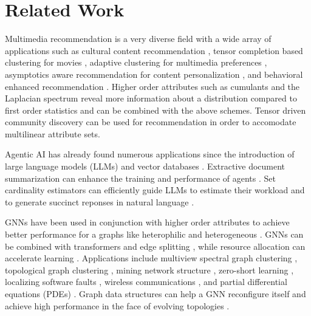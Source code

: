 \documentclass[conference, compsoc, final]{IEEEtran}
\begin{document}
\section{Related Work}\label{sec:work}


Multimedia recommendation \cite{wu:2020} is a very diverse field \cite{sattari:2025}\cite{gan:2025} with a wide array of applications such as cultural content recommendation \cite{drakop:2022:ncaa:som}, tensor completion based clustering for movies \cite{wang:2025}, adaptive clustering for multimedia preferences \cite{xiong:2025}, asymptotics aware recommendation for content personalization \cite{xu:2025}, and behavioral enhanced recommendation \cite{drakop:2021:iisa:beh}. Higher order attributes such as cumulants \cite{pakravan:2018}\cite{bonnier:2024} and the Laplacian spectrum \cite{zhuo:2024} reveal more information about a distribution compared to first order statistics \cite{cho:2024}\cite{li:2024} and can be combined with the above schemes. Tensor driven community discovery can be used for recommendation \cite{drakop:2020:smap:kruskal} in order to accomodate multilinear attribute sets.  

Agentic AI \cite{abou:2025}\cite{pati:2025} has already found numerous applications since the introduction of large language models (LLMs) \cite{acharya:2025} and vector databases \cite{drakop:2025:adhd:func}. Extractive document summarization \cite{drakop:2025:adhd:gnn} can enhance the training and performance of agents \cite{murugesan:2025}\cite{raheem:2025}. Set cardinality estimators \cite{drakop:2016:sac} can efficiently guide LLMs to estimate their workload \cite{jiang:2026} and to generate succinct reponses in natural language \cite{gonzalez:2026}.

GNNs have been used in conjunction with higher order attributes \cite{li:2021} to achieve better performance \cite{you:2020} for a graphs like heterophilic \cite{bi:2024} and heterogeneous \cite{wang:2024}. GNNs can be combined with transformers \cite{sun:2024} and edge splitting \cite{guo:2024}, while resource allocation can accelerate learning \cite{peng:2024}. Applications include multiview spectral graph clustering \cite{xie:2024}, topological graph clustering \cite{drakop:2024:adhd}\cite{ullah:2020}\cite{ding:2024}\cite{you:2021}, mining network structure \cite{hu:2021}\cite{drakop:2022:adhd}, zero-short learning \cite{liu:2020}, localizing software faults \cite{gou:2024}, wireless communications \cite{mourya:2024}, and partial differential equations (PDEs) \cite{gladstone:2024}. Graph data structures can help a GNN reconfigure itself and achieve high performance in the face of evolving topologies \cite{drakop:2014:ictai}.
\end{document}

